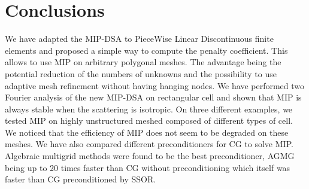 \section{Conclusions} \label{sec_conc}
We have adapted the MIP-DSA to PieceWise Linear Discontinuous finite elements
and proposed a simple way to compute the penalty coefficient. This allows to 
use MIP on arbitrary polygonal meshes. The advantage being the potential reduction 
of the numbers of unknowns and the possibility to use adaptive mesh refinement 
without having hanging nodes. We have performed two Fourier analysis of the
new MIP-DSA on rectangular cell and shown that MIP is always stable when the
scattering is isotropic. On three different examples, we tested MIP on highly
unstructured meshed composed of different types of cell. We noticed that the
efficiency of MIP does not seem to be degraded on these meshes. We have also
compared different preconditioners for CG to solve MIP. Algebraic multigrid
methods were found to be the best preconditioner, AGMG being up to 20 times
faster than CG without preconditioning which itself was faster than CG
preconditioned by SSOR.
